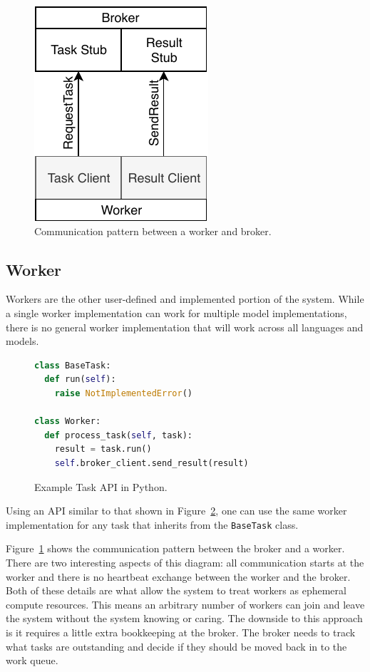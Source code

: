 \documentclass[conference]{IEEEtran}
\begin{document}
\begin{figure}
  \centering
  \includegraphics{img/broker_worker}
  \caption{Communication pattern between a worker and broker.}
  \label{fig:worker-broker}
\end{figure}

\subsection{Worker}
Workers are the other user-defined and implemented portion of the system. While
a single worker implementation can work for multiple model implementations,
there is no general worker implementation that will work across all languages
and models.

\begin{figure}
  \begin{lstlisting}[language=python]
class BaseTask:
  def run(self):
    raise NotImplementedError()

class Worker:
  def process_task(self, task):
    result = task.run()
    self.broker_client.send_result(result)
  \end{lstlisting}
  \caption{Example Task API in Python.}\label{fig:python-api}
\end{figure}

Using an API similar to that shown in Figure~\ref{fig:python-api}, one can use
the same worker implementation for any task that inherits from the
\texttt{BaseTask} class.

Figure~\ref{fig:worker-broker} shows the communication pattern between the
broker and a worker. There are two interesting aspects of this diagram: all
communication starts at the worker and there is no heartbeat exchange between
the worker and the broker. Both of these details are what allow the system to
treat workers as ephemeral compute resources. This means an arbitrary number of
workers can join and leave the system without the system knowing or caring. The
downside to this approach is it requires a little extra bookkeeping at the
broker. The broker needs to track what tasks are outstanding and decide if they
should be moved back in to the work queue.
\end{document}
